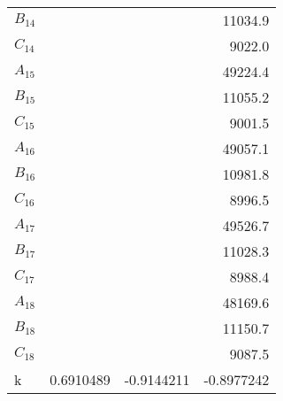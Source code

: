\begin{table}
\begin{tabular}{lrrr}
$B_{14   }$ &                 &                 &         11034.9 \\
$C_{14   }$ &                 &                 &          9022.0 \\
$A_{15   }$ &                 &                 &         49224.4 \\
$B_{15   }$ &                 &                 &         11055.2 \\
$C_{15   }$ &                 &                 &          9001.5 \\
$A_{16   }$ &                 &                 &         49057.1 \\
$B_{16   }$ &                 &                 &         10981.8 \\
$C_{16   }$ &                 &                 &          8996.5 \\
$A_{17   }$ &                 &                 &         49526.7 \\
$B_{17   }$ &                 &                 &         11028.3 \\
$C_{17   }$ &                 &                 &          8988.4 \\
$A_{18   }$ &                 &                 &         48169.6 \\
$B_{18   }$ &                 &                 &         11150.7 \\
$C_{18   }$ &                 &                 &          9087.5 \\
k      &       0.6910489 &      -0.9144211 &      -0.8977242 \\
\end{tabular}
\end{table}
